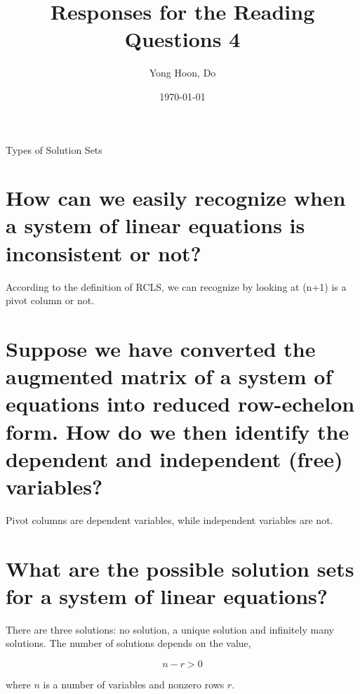 \documentclass{article}
\title{Responses for the Reading Questions 4}
\author{Yong Hoon, Do}
\date{\today}
\begin{document}
\maketitle

\begin{center}
Types of Solution Sets
\end{center}

\section{How can we easily recognize when a system of linear equations is inconsistent or not?}
According to the definition of RCLS, we can recognize by looking at (n+1) is a pivot column or not.

\section{Suppose we have converted the augmented matrix of a system of equations into reduced row-echelon form. How do we then identify the dependent and independent (free) variables?}
Pivot columns are dependent variables, while independent variables are not.

\section{What are the possible solution sets for a system of linear equations?}
There are three solutions: no solution, a unique solution and infinitely many solutions.
The number of solutions depends on the value,

\[
n - r > 0
\]

where \(n\) is a number of variables and nonzero rows \(r\).
\end{document}
